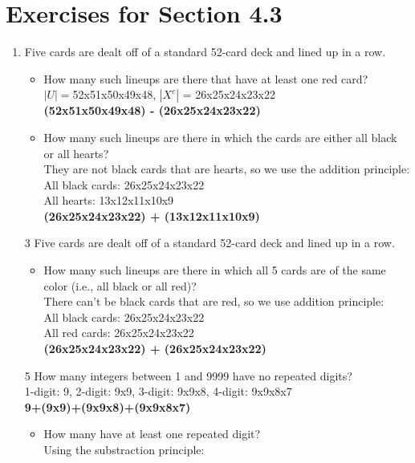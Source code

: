 \documentclass[12pt]{article}
\begin{document}
\section*{Exercises for Section 4.3}
\begin{enumerate}
    \item Five cards are dealt off of a standard 52-card deck and lined up in a row.
	\begin{itemize}
		\item How many such lineups are there that have at least one red card?\\
		    $|U| = $52x51x50x49x48, $|X^c|$ = 26x25x24x23x22\\
		    \textbf{(52x51x50x49x48) - (26x25x24x23x22)}
		\item How many such lineups are there in which the cards are either all black or all hearts?\\
		    They are not black cards that are hearts, so we use the addition principle:\\
		    All black cards: 26x25x24x23x22\\
		    All hearts: 13x12x11x10x9\\
		    \textbf{(26x25x24x23x22) + (13x12x11x10x9)}
	\end{itemize}
    \item [3] Five cards are dealt off of a standard 52-card deck and lined up in a row.
	\begin{itemize}
		\item How many such lineups are there in which all 5 cards are of the same color (i.e., all black or all red)?\\
		    There can't be black cards that are red, so we use addition principle:\\
		    All black cards: 26x25x24x23x22\\
		    All red cards: 26x25x24x23x22\\
		    \textbf{(26x25x24x23x22) + (26x25x24x23x22)}
	\end{itemize}
    \item [5] How many integers between 1 and 9999 have no repeated digits?\\
	1-digit: 9, 2-digit: 9x9, 3-digit: 9x9x8, 4-digit: 9x9x8x7\\
	\textbf{9+(9x9)+(9x9x8)+(9x9x8x7)}
	\begin{itemize}
		\item How many have at least one repeated digit?\\
		    Using the substraction principle:\\

\end{itemize}
\end{enumerate}
\end{document}
